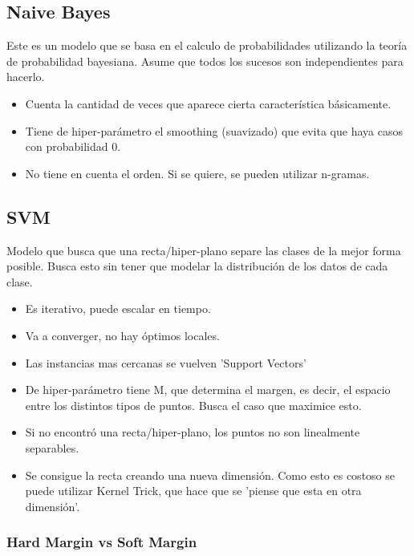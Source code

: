 \documentclass[titlepage,a4paper]{article}
\begin{document}
\subsection{Naive Bayes}
Este es un modelo que se basa en el calculo de probabilidades utilizando la teoría de probabilidad bayesiana. Asume que todos los sucesos son independientes para hacerlo.

\begin{itemize}
    \item Cuenta la cantidad de veces que aparece cierta característica básicamente.
    \item Tiene de hiper-parámetro el smoothing (suavizado) que evita que haya casos con probabilidad 0.
    \item No tiene en cuenta el orden. Si se quiere, se pueden utilizar n-gramas.
    
\end{itemize}


\subsection{SVM}

Modelo que busca que una recta/hiper-plano separe las clases de la mejor forma posible. Busca esto sin tener que modelar la distribución de los datos de cada clase.

\begin{itemize}
    \item Es iterativo, puede escalar en tiempo.
    \item Va a converger, no hay óptimos locales.
    \item Las instancias mas cercanas se vuelven 'Support Vectors'
    \item De hiper-parámetro tiene M, que determina el margen, es decir, el espacio entre los distintos tipos de puntos. Busca el caso que maximice esto.
    \item Si no encontró una recta/hiper-plano, los puntos no son linealmente separables.
    \item Se consigue la recta creando una nueva dimensión. Como esto es costoso se puede utilizar Kernel Trick, que hace que se 'piense que esta en otra dimensión'.
\end{itemize}

\subsubsection*{Hard Margin vs Soft Margin}
\end{document}
